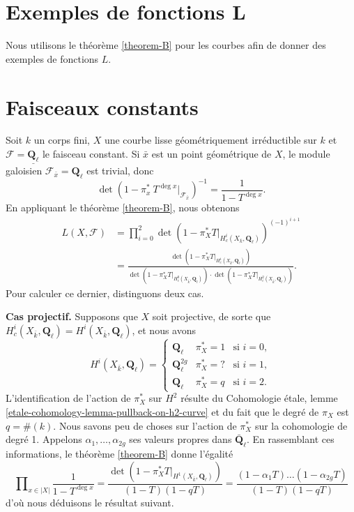 \section{Exemples de fonctions L}
\label{section-examples-L-functions}

\noindent
Nous utilisons le théorème \ref{theorem-B} pour les courbes afin de donner des exemples de fonctions $L$.





\section{Faisceaux constants}
\label{section-L-function-constant-sheaf}

\noindent
Soit $k$ un corps fini, $X$ une courbe lisse géométriquement irréductible sur
$k$ et $\mathcal{F} = \underline{\mathbf{Q}_\ell}$ le faisceau constant. Si
$\bar x$ est un point géométrique de $X$, le module galoisien
$\mathcal{F}_{\bar x} = \mathbf{Q}_\ell$ est trivial, donc
$$
\det(1-\pi_x^*\ T^{\deg x} |_{\mathcal{F}_{\bar x}})^{-1} =
\frac{1}{1-T^{\deg x}}.
$$
En appliquant le théorème \ref{theorem-B}, nous obtenons
\begin{align*}
L(X, \mathcal{F})
& =
\prod_{i = 0}^2
\det(1 - \pi_X^*T |_{H_c^i(X_{\bar k}, \mathbf{Q}_\ell)})^{(-1)^{i+1}} \\
& =
\frac{\det(1 - \pi_X^*T |_{H_c^1(X_{\bar k}, \mathbf{Q}_\ell)})}{
\det(1 - \pi_X^*T |_{H_c^0(X_{\bar k}, \mathbf{Q}_\ell)})
\cdot \det(1 - \pi_X^*T |_{H_c^2(X_{\bar k}, \mathbf{Q}_\ell)})}.
\end{align*}
Pour calculer ce dernier, distinguons deux cas.


\medskip\noindent
{\bf Cas projectif.}
Supposons que $X$ soit projective, de sorte que $H_c^i(X_{\bar k}, \mathbf{Q}_\ell) =
H^i(X_{\bar k}, \mathbf{Q}_\ell)$, et nous avons
$$
H^i(X_{\bar k}, \mathbf{Q}_\ell) =
\left\{
\begin{matrix}
\mathbf{Q}_\ell & \pi_X^* = 1 & \text{si }i = 0, \\
\mathbf{Q}_\ell^{2g} & \pi_X^* = ? & \text{si }i = 1, \\
\mathbf{Q}_\ell & \pi_X^* = q & \text{si }i = 2.
\end{matrix}
\right.
$$
L'identification de l'action de $\pi_X^*$ sur $H^2$ résulte du
Cohomologie \'etale, lemme \ref{etale-cohomology-lemma-pullback-on-h2-curve}
et du fait que le degré
de $\pi_X$ est $q = \#(k)$.
Nous savons peu de choses sur l'action de $\pi_X^*$ sur la cohomologie de degré 1.
Appelons $\alpha_1, \ldots, \alpha_{2g}$ ses valeurs propres dans
$\bar{\mathbf{Q}}_\ell$. En rassemblant ces informations,
le théorème \ref{theorem-B}
donne l'égalité
$$
\prod\nolimits_{x \in |X|} \frac{1}{1 - T^{\deg x}} =
\frac{\det(1- \pi_X^* T|_{H^1(X_{\bar k}, \mathbf{Q}_\ell)})}{(1-T)(1-qT)} =
\frac{(1 - \alpha_1 T) \ldots (1 - \alpha_{2g}T)}{(1-T)(1-qT)}
$$
d'où nous déduisons le résultat suivant.

